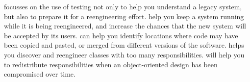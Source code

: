 \documentclass[a4paper,10pt,twoside]{book}
\begin{document}
 focusses on the use of testing not only to help you understand a legacy system, but also to prepare it for a reengineering effort.  help you keep a system running while it is being reengineered, and increase the chances that the new system will be accepted by its users.  can help you identify locations where code may have been copied and pasted, or merged from different versions of the software.  helps you discover and reengineer classes with too many responsibilities.  will help you to redistribute responsibilities when an object-oriented design has been compromised over time.

\ifx\wholebook\relax\else
   
   
   
\end{document}
